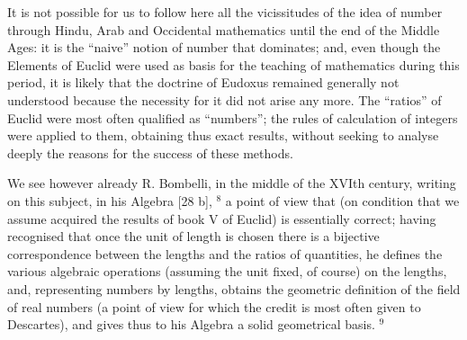 It is not possible for us to follow here all the vicissitudes of the idea of number through Hindu, Arab and Occidental mathematics until the end of the Middle Ages: it is the ``naive'' notion of number that dominates; and, even though the Elements of Euclid were used as basis for the teaching of mathematics during this period, it is likely that the doctrine of Eudoxus remained generally not understood because the necessity for it did not arise any more. The ``ratios'' of Euclid were most often qualified as ``numbers''; the rules of calculation of integers were applied to them, obtaining thus exact results, without seeking to analyse deeply the reasons for the success of these methods.

We see however already R. Bombelli, in the middle of the XVIth century, writing on this subject, in his Algebra {[}28 b{]}, \(^{8}\) a point of view that (on condition that we assume acquired the results of book V of Euclid) is essentially correct; having recognised that once the unit of length is chosen there is a bijective correspondence between the lengths and the ratios of quantities, he defines the various algebraic operations (assuming the unit fixed, of course) on the lengths, and, representing numbers by lengths, obtains the geometric definition of the field of real numbers (a point of view for which the credit is most often given to Descartes), and gives thus to his Algebra a solid geometrical basis. \(^{9}\)

